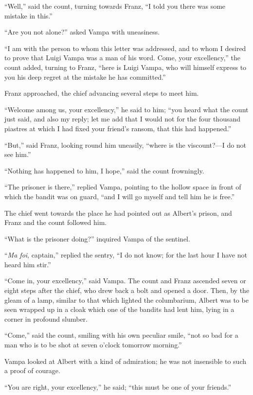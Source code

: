“Well,” said the count, turning towards Franz, “I told you there was
some mistake in this.”

“Are you not alone?” asked Vampa with uneasiness.

“I am with the person to whom this letter was addressed, and to whom I
desired to prove that Luigi Vampa was a man of his word. Come, your
excellency,” the count added, turning to Franz, “here is Luigi Vampa,
who will himself express to you his deep regret at the mistake he has
committed.”

Franz approached, the chief advancing several steps to meet him.

“Welcome among us, your excellency,” he said to him; “you heard what
the count just said, and also my reply; let me add that I would not for
the four thousand piastres at which I had fixed your friend’s ransom,
that this had happened.”

“But,” said Franz, looking round him uneasily, “where is the
viscount?—I do not see him.”

“Nothing has happened to him, I hope,” said the count frowningly.

“The prisoner is there,” replied Vampa, pointing to the hollow space in
front of which the bandit was on guard, “and I will go myself and tell
him he is free.”

The chief went towards the place he had pointed out as Albert’s prison,
and Franz and the count followed him.

“What is the prisoner doing?” inquired Vampa of the sentinel.

“\textit{Ma foi}, captain,” replied the sentry, “I do not know; for the last
hour I have not heard him stir.”

“Come in, your excellency,” said Vampa. The count and Franz ascended
seven or eight steps after the chief, who drew back a bolt and opened a
door. Then, by the gleam of a lamp, similar to that which lighted the
columbarium, Albert was to be seen wrapped up in a cloak which one of
the bandits had lent him, lying in a corner in profound slumber.

“Come,” said the count, smiling with his own peculiar smile, “not so
bad for a man who is to be shot at seven o’clock tomorrow morning.”

Vampa looked at Albert with a kind of admiration; he was not insensible
to such a proof of courage.

“You are right, your excellency,” he said; “this must be one of your
friends.”

